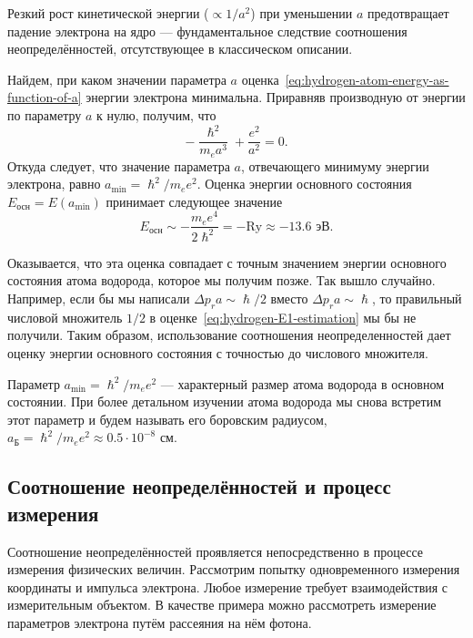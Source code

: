 \documentclass[a4paper, 12pt]{article}
\begin{document}
Резкий рост кинетической энергии ($\propto 1/a^2$) при уменьшении $a$ предотвращает
падение электрона на ядро --- фундаментальное следствие соотношения
неопределённостей, отсутствующее в классическом описании.

Найдем, при каком значении параметра $a$
оценка~\eqref{eq:hydrogen-atom-energy-as-function-of-a} энергии электрона
минимальна. Приравняв производную от энергии по параметру $a$ к нулю, получим,
что
\begin{equation}
  -\frac{\hslash^2}{m_ea^3} + \frac{e^2}{a^2} = 0.
\end{equation}
Откуда следует, что значение параметра $a$, отвечающего минимуму энергии
электрона, равно $a_{\text{min}}=\hslash^2/m_ee^2$. Оценка энергии основного
состояния $E_\text{осн}=E(a_{\text{min}})$ принимает следующее значение
\begin{equation}
  \label{eq:hydrogen-E1-estimation}
  E_{\text{осн}} \sim -\frac{m_ee^4}{2\hslash^2}=-\text{Ry}\approx-{13.6}\text{ эВ}.
\end{equation}

Оказывается, что эта оценка совпадает с точным значением энергии основного
состояния атома водорода, которое мы получим позже. Так вышло случайно.
Например, если бы мы написали $\Delta{p}_ra\sim\hslash/2$ вместо $\Delta{p}_ra\sim\hslash$, то
правильный числовой множитель $1/2$ в оценке~\eqref{eq:hydrogen-E1-estimation}
мы бы не получили. Таким образом, использование соотношения неопределенностей
дает оценку энергии основного состояния с точностью до числового множителя.

Параметр $a_{\text{min}}=\hslash^2/m_ee^2$ --- характерный размер атома водорода в
основном состоянии. При более детальном изучении атома водорода мы снова
встретим этот параметр и будем называть его боровским радиусом,
$a_{\text{Б}}=\hslash^2/m_ee^2\approx{0.5\cdot 10^{-8}}\text{ см}$.

\subsection{Соотношение неопределённостей и процесс измерения}

Соотношение неопределённостей проявляется непосредственно в процессе измерения физических величин. Рассмотрим попытку одновременного измерения координаты и импульса электрона. Любое измерение требует взаимодействия с измерительным объектом. В качестве примера можно рассмотреть измерение параметров электрона путём рассеяния на нём фотона.
\end{document}

